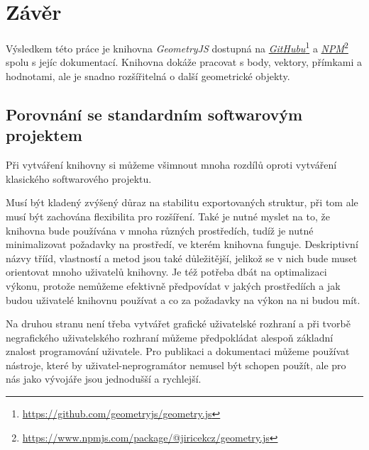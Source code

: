 \chapter{Závěr}
\label{chap:conclusion}

Výsledkem této práce je knihovna \textit{GeometryJS} dostupná na \textit{\hyperlink{https://github.com/geometryjs/geometry.js}{GitHubu}}\footnote{\url{https://github.com/geometryjs/geometry.js}} a \textit{\hyperlink{https://www.npmjs.com/package/@jiricekcz/geometry.js}{NPM}}\footnote{\url{https://www.npmjs.com/package/@jiricekcz/geometry.js}} spolu s jejíc dokumentací.
Knihovna dokáže pracovat s body, vektory, přímkami a hodnotami, ale je snadno rozšířitelná o další geometrické objekty.

\section{Porovnání se standardním softwarovým projektem}
\label{sec:comparison}

Při vytváření knihovny si můžeme všimnout mnoha rozdílů oproti vytváření klasického softwarového projektu.

Musí být kladený zvýšený důraz na stabilitu exportovaných struktur, při tom ale musí být zachována flexibilita pro rozšíření.
Také je nutné myslet na to, že knihovna bude používána v mnoha různých prostředích, tudíž je nutné minimalizovat požadavky na prostředí, ve kterém knihovna funguje.
Deskriptivní názvy třííd, vlastností a metod jsou také důležitější, jelikož se v nich bude muset orientovat mnoho uživatelů knihovny.
Je též potřeba dbát na optimalizaci výkonu, protože nemůžeme efektivně předpovídat v jakých prostředíích a jak budou uživatelé knihovnu používat a co za požadavky na výkon na ni budou mít.

Na druhou stranu není třeba vytvářet grafické uživatelské rozhraní a při tvorbě negrafického uživatelského rozhraní můžeme předpokládat alespoň základní znalost programování uživatele.
Pro publikaci a dokumentaci můžeme používat nástroje, které by uživatel-neprogramátor nemusel být schopen použít, ale pro nás jako vývojáře jsou jednodušší a rychlejší.

